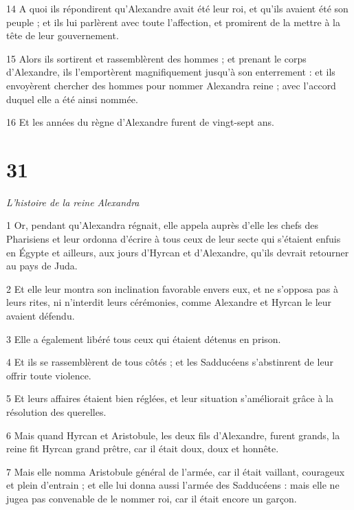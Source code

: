 \par 14 A quoi ils répondirent qu'Alexandre avait été leur roi, et qu'ils avaient été son peuple ; et ils lui parlèrent avec toute l'affection, et promirent de la mettre à la tête de leur gouvernement.

\par 15 Alors ils sortirent et rassemblèrent des hommes ; et prenant le corps d'Alexandre, ils l'emportèrent magnifiquement jusqu'à son enterrement : et ils envoyèrent chercher des hommes pour nommer Alexandra reine ; avec l'accord duquel elle a été ainsi nommée.

\par 16 Et les années du règne d'Alexandre furent de vingt-sept ans.

\chapter{31}

\par \textit{L'histoire de la reine Alexandra}

\par 1 Or, pendant qu'Alexandra régnait, elle appela auprès d'elle les chefs des Pharisiens et leur ordonna d'écrire à tous ceux de leur secte qui s'étaient enfuis en Égypte et ailleurs, aux jours d'Hyrcan et d'Alexandre, qu'ils devrait retourner au pays de Juda.

\par 2 Et elle leur montra son inclination favorable envers eux, et ne s'opposa pas à leurs rites, ni n'interdit leurs cérémonies, comme Alexandre et Hyrcan le leur avaient défendu.

\par 3 Elle a également libéré tous ceux qui étaient détenus en prison.

\par 4 Et ils se rassemblèrent de tous côtés ; et les Sadducéens s'abstinrent de leur offrir toute violence.

\par 5 Et leurs affaires étaient bien réglées, et leur situation s'améliorait grâce à la résolution des querelles.

\par 6 Mais quand Hyrcan et Aristobule, les deux fils d'Alexandre, furent grands, la reine fit Hyrcan grand prêtre, car il était doux, doux et honnête.

\par 7 Mais elle nomma Aristobule général de l'armée, car il était vaillant, courageux et plein d'entrain ; et elle lui donna aussi l'armée des Sadducéens : mais elle ne jugea pas convenable de le nommer roi, car il était encore un garçon.

